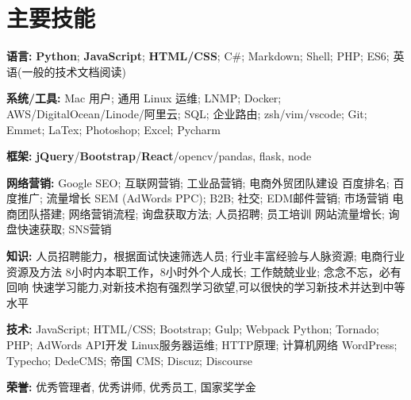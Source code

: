 \section{\textbf{主要技能}}
\resumeSubHeadingListStart
\item{
  \textbf{语言:}{ \textbf{Python}; \textbf{JavaScript}; \textbf{HTML/CSS}; C\#; Markdown; Shell; PHP; ES6; 英语(一般的技术文档阅读)}
}
\item{
 \textbf{系统/工具:}{ Mac 用户; 通用 Linux 运维; LNMP; Docker; AWS/DigitalOcean/Linode/阿里云; SQL; 企业路由; zsh/vim/vscode; Git; Emmet; LaTex; Photoshop; Excel; Pycharm}
}
\item{
 \textbf{框架:}{ \textbf{jQuery}/\textbf{Bootstrap}/\textbf{React}/opencv/pandas, flask, node}
}
\item{
  \textbf{网络营销:}{
    \resumeItemListStart
       {Google SEO; 互联网营销; 工业品营销; 电商外贸团队建设 }
       {百度排名; 百度推广; 流量增长}
       {SEM (AdWords PPC); B2B; 社交; EDM邮件营销; 市场营销 }
       {电商团队搭建; 网络营销流程; 询盘获取方法; 人员招聘; 员工培训 }
       {网站流量增长; 询盘快速获取; SNS营销}
   \resumeItemListEnd
  }
}
\item{
  \textbf{知识:}{
    \resumeItemListStart
       {人员招聘能力，根据面试快速筛选人员; 行业丰富经验与人脉资源; 电商行业资源及方法}
       {8小时内本职工作，8小时外个人成长; 工作兢兢业业; 念念不忘，必有回响}
       {快速学习能力,对新技术抱有强烈学习欲望,可以很快的学习新技术并达到中等水平}
   \resumeItemListEnd
  }
}
\item{
  \textbf{技术:}{
    \resumeItemListStart
       {JavaScript; HTML/CSS; Bootstrap; Gulp; Webpack }
       {Python; Tornado; PHP; AdWords API开发}
       {Linux服务器运维; HTTP原理; 计算机网络}
       {WordPress; Typecho; DedeCMS; 帝国 CMS; Discuz; Discourse}
   \resumeItemListEnd
  }
}
\item{
 \textbf{荣誉:}{
  优秀管理者, 优秀讲师, 优秀员工, 国家奖学金
 }
}
\resumeSubHeadingListEnd
